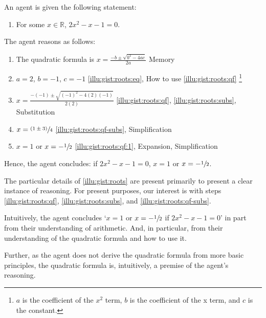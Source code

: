 \begin{note}
  \begin{scenario}
    \label{illu:gist:roots}
    An agent is given the following statement:

    \begin{enumerate}[label=\arabic*., ref=(\arabic*)]
    \item
      \label{illu:gist:roots:eq}
      For some \(x \in \mathbb{R}\), \(2x^{2} - x - 1 = 0\).
    \end{enumerate}

    The agent reasons as follows:

    \begin{enumerate}[label=\arabic*., ref=(\arabic*), resume, itemsep=.125em]
    \item
      \label{illu:gist:roots:qf}
      The quadratic formula is \(x = \frac{-b \pm \sqrt{b^{2} - 4ac}}{2a}\) \hfill Memory
    \item
      \label{illu:gist:roots:subs}
      \(a = 2\), \(b = -1\), \(c = -1\) \hfill \ref{illu:gist:roots:eq}, How to use \ref{illu:gist:roots:qf}%
      \footnote{
        \(a\) is the coefficient of the \(x^{2}\) term, \(b\) is the coefficient of the x term, and \(c\) is the constant.
      }
    \item
      \label{illu:gist:roots:qf-subs}
      \(x = \frac{-(-1) \pm \sqrt{(-1)^{2} - 4(2)(-1)}}{2(2)}\) \hfill \ref{illu:gist:roots:qf}, \ref{illu:gist:roots:subs}, Substitution
    \item
      \label{illu:gist:roots:qf:1}
      \(x = \sfrac{(1 \pm 3)}{4}\) \hfill \ref{illu:gist:roots:qf-subs}, Simplification
    \item
      \label{illu:gist:roots:qf:done}
      \(x = 1\) or \(x = -\sfrac{1}{2}\) \hfill \ref{illu:gist:roots:qf:1}, Expansion, Simplification
    \end{enumerate}
    Hence, the agent concludes: if \(2x^{2} - x - 1 = 0\), \(x = 1\) or \(x = -\sfrac{1}{2}\).
  \end{scenario}

  The particular details of \autoref{illu:gist:roots} are present primarily to present a clear instance of reasoning.
  For present purposes, our interest is with steps \ref{illu:gist:roots:qf}, \ref{illu:gist:roots:subs}, and \ref{illu:gist:roots:qf-subs}.

  Intuitively, the agent concludes `\(x = 1\) or \(x = -\sfrac{1}{2}\) if \(2x^{2} - x - 1 = 0\)' in part from their understanding of arithmetic.
  And, in particular, from their understanding of the quadratic formula and how to use it.

  Further, as the agent does not derive the quadratic formula from more basic principles, the quadratic formula is, intuitively, a premise of the agent's reasoning.
\end{note}

